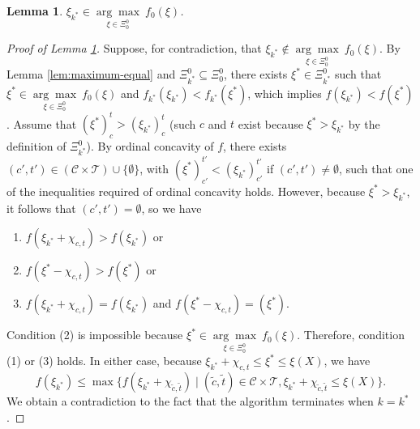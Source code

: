 \documentclass[12pt]{amsart}
\newtheorem{lemma}{Lemma}
\theoremstyle{remark}
\begin{document}
\begin{lemma}\label{lem:outcome-maximizer}
$\xi_{k^*} \in \underset {\xi\in \Xi^0_0} {\arg\max} \: f_0(\xi)$.
\end{lemma}
\begin{proof}[Proof of Lemma \ref{lem:outcome-maximizer}]\renewcommand{\qedsymbol}{$\blacksquare$}
Suppose, for contradiction, that $\xi_{k^*} \notin \underset {\xi\in \Xi^0_0} {\arg\max} \: f_0(\xi)$.
By Lemma \ref{lem:maximum-equal} and $\Xi^0_{k^*}\subseteq \Xi^0_0$, there exists $\xi^* \in \Xi^0_{k^*}$ such that $\xi^*\in \underset {\xi\in \Xi^0_0} {\arg\max} \: f_0(\xi)$ and $f_{k^*}(\xi_{k^*})<f_{k^*}(\xi^*)$, which implies $f(\xi_{k^*})<f(\xi^*)$.
Assume that  $(\xi^*)^t_c >(\xi_{k^*})^t_c$ (such $c$ and $t$ exist because $\xi^*>\xi_{k^*}$ by the definition of $\Xi^0_{k^*}$).
By ordinal concavity of $f$, there exists $(c',t') \in (\mathcal C \times \mathcal T) \cup \{\emptyset\}$, with $(\xi^*)^{t'}_{c'} <(\xi_{k^*})^{t'}_{c'}$ if $(c',t') \neq \emptyset$, such that one of the inequalities required of  ordinal concavity holds.
However, because $\xi^* > \xi_{k^*}$, it follows that $(c',t')=\emptyset$, so we have
\begin{enumerate}
\item $f(\xi_{k^*}+\chi_{c,t})>f(\xi_{k^*})$ or
\item $f(\xi^*-\chi_{c,t})>f(\xi^*)$ or
\item $f(\xi_{k^*}+\chi_{c,t})=f(\xi_{k^*})$ and $f(\xi^*-\chi_{c,t})=(\xi^*)$.
\end{enumerate}
Condition (2) is impossible because $\xi^* \in \underset {\xi\in \Xi^0_0} {\arg\max} \: f_0(\xi)$. Therefore, condition (1) or (3) holds. In either case, because $\xi_{k^*}+\chi_{c,t}\leq \xi^*\leq \xi(X)$, we have
$$
f(\xi_{k^*}) \leq \max\{f(\xi_{k^*}+\chi_{\tilde c, \tilde t})\mid (\tilde c, \tilde t) \in \mathcal C \times \mathcal T, \xi_{k^*}+\chi_{\tilde c, \tilde t}\leq \xi(X)\}.
$$
We obtain a contradiction to the fact that the algorithm terminates when $k=k^*$.
\end{proof}
\end{document}
